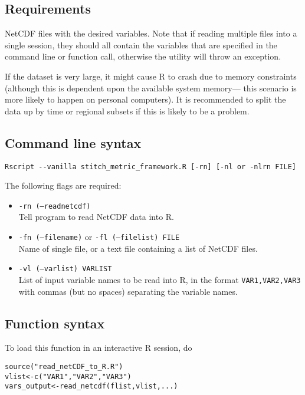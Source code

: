 \documentclass{article}
\begin{document}
\subsection{Requirements}
NetCDF files with the desired variables. Note that if reading multiple files into a single session, they should all contain the variables that are specified in the command line or function call, otherwise the utility will throw an exception. 

If the dataset is very large, it might cause R to crash due to memory constraints (although this is dependent upon the available system memory--- this scenario is more likely to happen on personal computers). It is recommended to split the data up by time or regional subsets if this is likely to be a problem.

\subsection{Command line syntax}

\begin{verbatim}
Rscript --vanilla stitch_metric_framework.R [-rn] [-nl or -nlrn FILE]
\end{verbatim}

The following flags are required:

\begin{itemize}
\item[] \texttt{-rn (--readnetcdf)}\\Tell program to read NetCDF data into R.
\item[] \texttt{-fn (--filename)} or \texttt{-fl (--filelist) FILE}\\ Name of single file, or a text file containing a list of NetCDF files.
\item[] \texttt{-vl (--varlist) VARLIST}\\ List of input variable names to be read into R, in the format \texttt{VAR1,VAR2,VAR3} with commas (but no spaces) separating the variable names.
\end{itemize}


\subsection{Function syntax}

To load this function in an interactive R session, do\begin{verbatim}
source("read_netCDF_to_R.R")
vlist<-c("VAR1","VAR2","VAR3")
vars_output<-read_netcdf(flist,vlist,...)
\end{verbatim}
\end{document}
